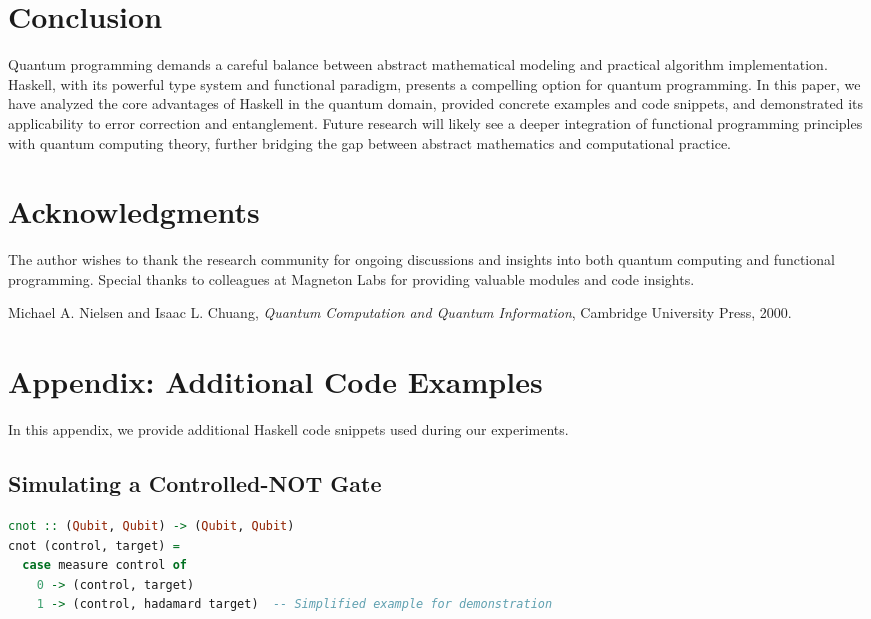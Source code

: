 \documentclass[12pt]{article}
\begin{document}
\section{Conclusion}
\label{sec:conclusion}
Quantum programming demands a careful balance between abstract mathematical modeling and practical algorithm implementation. Haskell, with its powerful type system and functional paradigm, presents a compelling option for quantum programming. In this paper, we have analyzed the core advantages of Haskell in the quantum domain, provided concrete examples and code snippets, and demonstrated its applicability to error correction and entanglement. Future research will likely see a deeper integration of functional programming principles with quantum computing theory, further bridging the gap between abstract mathematics and computational practice.

\section*{Acknowledgments}
The author wishes to thank the research community for ongoing discussions and insights into both quantum computing and functional programming. Special thanks to colleagues at Magneton Labs for providing valuable modules and code insights.

\begin{thebibliography}{9}
Michael A. Nielsen and Isaac L. Chuang, \emph{Quantum Computation and Quantum Information}, Cambridge University Press, 2000.
\end{thebibliography}

\newpage
\appendix

\section{Appendix: Additional Code Examples}
In this appendix, we provide additional Haskell code snippets used during our experiments.

\subsection{Simulating a Controlled-NOT Gate}
\begin{lstlisting}[language=Haskell]
cnot :: (Qubit, Qubit) -> (Qubit, Qubit)
cnot (control, target) =
  case measure control of
    0 -> (control, target)
    1 -> (control, hadamard target)  -- Simplified example for demonstration
\end{lstlisting}
\end{document}
